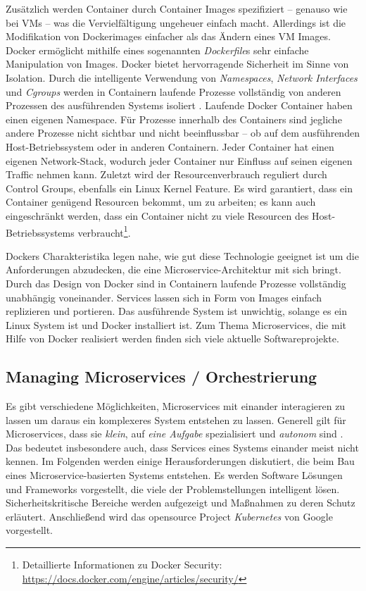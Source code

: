 Zusätzlich werden Container durch Container Images spezifiziert -- genauso wie bei VMs -- was die Vervielfältigung ungeheuer einfach macht. Allerdings ist die Modifikation von Dockerimages einfacher als das Ändern eines VM Images. Docker ermöglicht mithilfe eines sogenannten \textit{Dockerfile}s sehr einfache Manipulation von Images. 
Docker bietet hervorragende Sicherheit im Sinne von Isolation. Durch die intelligente Verwendung von \textit{Namespaces}, \textit{Network Interfaces} und \textit{Cgroups} werden in Containern laufende Prozesse vollständig von anderen Prozessen des ausführenden Systems isoliert \cite{newman2015,marmol2015}. Laufende Docker Container haben einen eigenen Namespace. Für Prozesse innerhalb des Containers sind jegliche andere Prozesse nicht sichtbar und nicht beeinflussbar -- ob auf dem ausführenden Host-Betriebssystem oder in anderen Containern. Jeder Container hat einen eigenen Network-Stack, wodurch jeder Container nur Einfluss auf seinen eigenen Traffic nehmen kann. Zuletzt wird der Resourcenverbrauch reguliert durch Control Groups, ebenfalls ein Linux Kernel Feature. Es wird garantiert, dass ein Container genügend Resourcen bekommt, um zu arbeiten; es kann auch eingeschränkt werden, dass ein Container nicht zu viele Resourcen des Host-Betriebssystems verbraucht\footnote{Detaillierte Informationen zu Docker Security: \url{https://docs.docker.com/engine/articles/security/}}.

Dockers Charakteristika legen nahe, wie gut diese Technologie geeignet ist um die Anforderungen abzudecken, die eine Microservice-Architektur mit sich bringt. Durch das Design von Docker sind in Containern laufende Prozesse vollständig unabhängig voneinander. Services lassen sich in Form von Images einfach replizieren und portieren. Das ausführende System ist unwichtig, solange es ein Linux System ist und Docker installiert ist. Zum Thema Microservices, die mit Hilfe von Docker realisiert werden finden sich viele aktuelle Softwareprojekte.


\subsection{Managing Microservices / Orchestrierung}

Es gibt verschiedene Möglichkeiten, Microservices mit einander interagieren zu lassen um daraus ein komplexeres System entstehen zu lassen. Generell gilt für Microservices, dass sie \textit{klein}, auf \textit{eine Aufgabe} spezialisiert und \textit{autonom} sind \cite{newman2015}. Das bedeutet insbesondere auch, dass Services eines Systems einander meist nicht kennen. Im Folgenden werden einige Herausforderungen diskutiert, die beim Bau eines Microservice-basierten Systems entstehen. Es werden Software Lösungen und Frameworks vorgestellt, die viele der Problemstellungen intelligent lösen. Sicherheitskritische Bereiche werden aufgezeigt und Maßnahmen zu deren Schutz erläutert. Anschließend wird das opensource Project \textit{Kubernetes} von Google vorgestellt.

